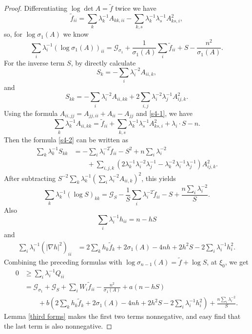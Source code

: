 \documentclass[11pt]{amsart}
\numberwithin{equation} {section}
\numberwithin{equation}{section}
\begin{document}
\begin{proof}
Differentiating $\log\det A=\tilde f$ twice we have
\begin{equation}\label{s4-1}
        \tilde f_{ii}
        =\sum_k\lambda_k^{-1}A_{kk,ii}
        -\sum_{k,s}\lambda_k^{-1}\lambda_s^{-1}A_{ks,i}^2,
\end{equation}
so, for $\log\sigma_1(A)$ we know
\[
        \sum_i\lambda_i^{-1}(\log\sigma_1(A))_{ii}
        =\mathcal G_{\sigma_1}+\frac{1}{\sigma_1(A)}\sum_i\tilde f_{ii}
        +S-\frac{n^2}{\sigma_1(A)}.
\]
For the inverse term $S$, by directly calculate
\[
        S_k=-\sum_i\lambda_i^{-2}A_{ii,k},
\]
and
\begin{equation}\label{s4-2}
        S_{kk}
        =-\sum_i\lambda_i^{-2}A_{ii,kk}
        +2\sum_{i,j}\lambda_i^{-2}\lambda_j^{-1}A_{ij,k}^2.
\end{equation}
Using the formula $A_{ii,jj}=A_{jj,ii}+A_{ii}-A_{jj}$ and \eqref{s4-1}, we have
\[
        \sum_k\lambda_k^{-1}A_{ii,kk}
        =\tilde f_{ii}
        +\sum_{k,s}\lambda_k^{-1}\lambda_s^{-1}A_{ks,i}^2
        +\lambda_i\cdot S-n.
\]
Then the formula \eqref{s4-2} can be written as
\[
\begin{split}
        \sum_k\lambda_k^{-1}S_{kk}
        &=-\sum_i\lambda_i^{-2}\tilde f_{ii}
        -S^2+n\sum_i\lambda_i^{-2}\\
        &\qquad
        +\sum_{i,j,k}
        \left(2\lambda_k^{-1}\lambda_i^{-2}\lambda_j^{-1}
        -\lambda_k^{-2}\lambda_i^{-1}\lambda_j^{-1}\right)A_{ij,k}^2.
\end{split}
\]
After subtracting $S^{-2}\sum_k\lambda_k^{-1}
(\sum_i\lambda_i^{-2}A_{ii,k})^2$, this yields
\begin{equation}\label{contracted log S}
        \sum_k\lambda_k^{-1}(\log S)_{kk}
        =\mathcal G_S-\frac{1}{S}\sum_i\lambda_i^{-2}\tilde f_{ii}
        -S+\frac{n\sum_i\lambda_i^{-2}}{S}.
\end{equation}
Also
\[
        \sum_i\lambda_i^{-1}h_{ii}=n-hS
\]
and
\[
\begin{split}
        \sum_i\lambda_i^{-1}(|\nabla h|^2)_{ii}
        &=2\sum_kh_k\tilde f_k+2\sigma_1(A)-4nh
        +2h^2S-2\sum_i\lambda_i^{-1}h_i^2.
\end{split}
\]
Combining the preceding formulas with $\log\sigma_{n-1}(A)=\tilde f+\log S$, at $\xi_0$,
we get
\begin{equation}\label{contracted Q}
\begin{split}
        0&\geq\sum_i\lambda_i^{-1}Q_{ii}\\
        &=\mathcal G_{\sigma_1}+\mathcal G_S+\sum_iW_i\tilde f_{ii}
        -\frac{n^2}{\sigma_1(A)}+a(n-hS)\\
        &\qquad
        +b\left(2\sum_kh_k\tilde f_k+2\sigma_1(A)-4nh
        +2h^2S-2\sum_i\lambda_i^{-1}h_i^2\right)
        +\frac{n\sum_i\lambda_i^{-2}}{S}.
\end{split}
\end{equation}
Lemma \ref{third forms} makes the first two terms nonnegative, and easy find that the last term is also
nonnegative.


\end{proof}
\end{document}
